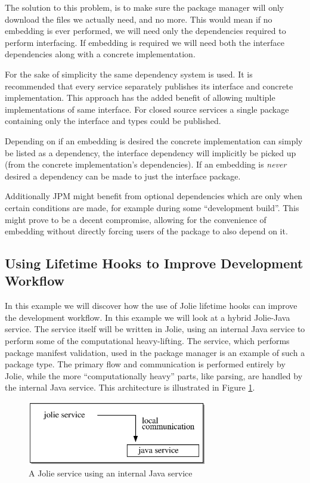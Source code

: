 The solution to this problem, is to make sure the package manager will only
download the files we actually need, and no more. This would mean if no
embedding is ever performed, we will need only the dependencies required to
perform interfacing. If embedding is required we will need both the interface
dependencies along with a concrete implementation.

For the sake of simplicity the same dependency system is used. It is
recommended that every service separately publishes its interface and concrete
implementation. This approach has the added benefit of allowing multiple
implementations of same interface. For closed source services a single package
containing only the interface and types could be published.

Depending on if an embedding is desired the concrete implementation can simply
be listed as a dependency, the interface dependency will implicitly be picked
up (from the concrete implementation's dependencies). If an embedding is
\emph{never} desired a dependency can be made to just the interface package.

Additionally JPM might benefit from optional dependencies which are only when
certain conditions are made, for example during some ``development build''.
This might prove to be a decent compromise, allowing for the convenience of
embedding without directly forcing users of the package to also depend on it.

\subsection{Using Lifetime Hooks to Improve Development Workflow}

In this example we will discover how the use of Jolie lifetime hooks can
improve the development workflow. In this example we will look at a hybrid
Jolie-Java service. The service itself will be written in Jolie, using an
internal Java service to perform some of the computational heavy-lifting.  The
 service, which performs package manifest validation, used in
the package manager is an example of such a package type. The primary flow and
communication is performed entirely by Jolie, while the more ``computationally
heavy'' parts, like parsing, are handled by the internal Java service.  This
architecture is illustrated in Figure \ref{fig:jolie_java_service}.

\begin{figure}[H]
\centering
\includegraphics[width=0.7\textwidth]{package_manager/jolie_java_service.eps}
\caption{A Jolie service using an internal Java service}
\label{fig:jolie_java_service}
\end{figure}

